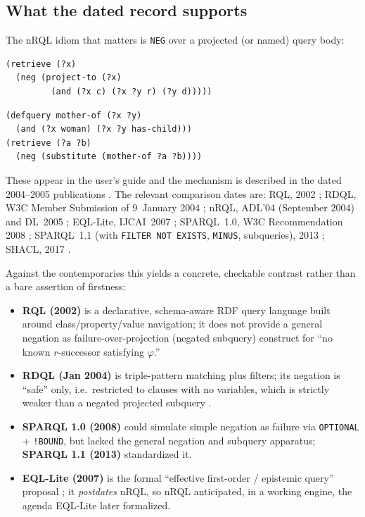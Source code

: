 \documentclass[11pt,letterpaper]{article}
\theoremstyle{definition}
\newcommand{\nrql}{nRQL}
\newcommand{\shacl}{SHACL}
\newcommand{\naf}{negation as failure}
\newcommand{\rdf}{RDF}
\begin{document}
\subsection{What the dated record supports}
The \nrql{} idiom that matters is \texttt{NEG} over a projected (or named) query body:
\begin{lstlisting}[language=nrql,caption={nRQL negated projected query body: an anti-existential subquery.}]
(retrieve (?x)
  (neg (project-to (?x)
         (and (?x c) (?x ?y r) (?y d)))))
\end{lstlisting}
\begin{lstlisting}[language=nrql,caption={NAF applied to a defined query body.}]
(defquery mother-of (?x ?y)
  (and (?x woman) (?x ?y has-child)))
(retrieve (?a ?b)
  (neg (substitute (mother-of ?a ?b))))
\end{lstlisting}
These appear in the user's guide \cite[pp.~119--122]{racerug} and the mechanism is described in the dated 2004--2005 publications \cite{adl04,nrql05}. The relevant comparison dates are: RQL, 2002 \cite{rql}; RDQL, W3C Member Submission of 9~January 2004 \cite{rdql}; \nrql{}, ADL'04 (September 2004) and DL~2005 \cite{adl04,nrql05}; EQL-Lite, IJCAI~2007 \cite{eqllite}; SPARQL~1.0, W3C Recommendation 2008 \cite{sparql10}; SPARQL~1.1 (with \texttt{FILTER NOT EXISTS}, \texttt{MINUS}, subqueries), 2013 \cite{sparql}; \shacl{}, 2017 \cite{shacl}.

Against the contemporaries this yields a concrete, checkable contrast rather than a bare assertion of firstness:
\begin{itemize}[leftmargin=2em]
  \item \textbf{RQL (2002)} is a declarative, schema-aware \rdf{} query language built around class/property/value navigation; it does not provide a general \naf{}-over-projection (negated subquery) construct for ``no known $r$-successor satisfying $\varphi$.''
  \item \textbf{RDQL (Jan 2004)} is triple-pattern matching plus filters; its negation is ``safe'' only, i.e.\ restricted to clauses with no variables, which is strictly weaker than a negated projected subquery \cite{rdql}.
  \item \textbf{SPARQL 1.0 (2008)} could simulate simple \naf{} via \texttt{OPTIONAL} + \texttt{!BOUND}, but lacked the general negation and subquery apparatus; \textbf{SPARQL 1.1 (2013)} standardized it.
  \item \textbf{EQL-Lite (2007)} is the formal ``effective first-order / epistemic query'' proposal \cite{eqllite}; it \emph{postdates} \nrql{}, so \nrql{} anticipated, in a working engine, the agenda EQL-Lite later formalized.
\end{itemize}
\end{document}
